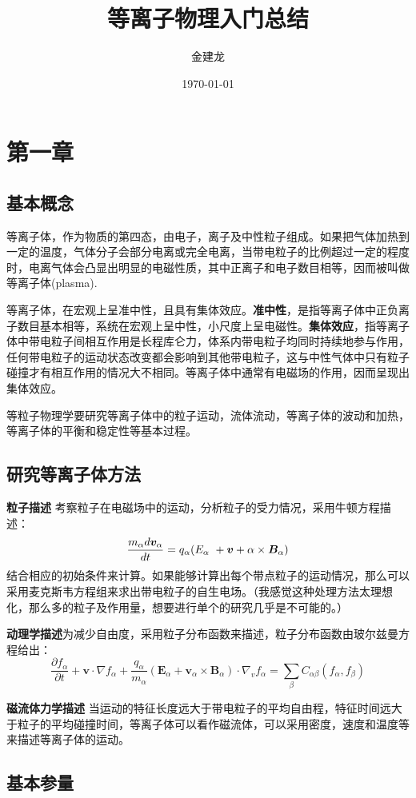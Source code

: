 \documentclass{article}
\title{等离子物理入门总结}
\author{金建龙}
\date{\today}
\begin{document}
\maketitle
\section{第一章}
\subsection{基本概念}
等离子体，作为物质的第四态，由电子，离子及中性粒子组成。如果把气体加热到一定的温度，气体分子会部分电离或完全电离，当带电粒子的比例超过一定的程度时，电离气体会凸显出明显的电磁性质，其中正离子和电子数目相等，因而被叫做等离子体(plasma).

等离子体，在宏观上呈准中性，且具有集体效应。\textbf{准中性}，是指等离子体中正负离子数目基本相等，系统在宏观上呈中性，小尺度上呈电磁性。\textbf{集体效应}，指等离子体中带电粒子间相互作用是长程库仑力，体系内带电粒子均同时持续地参与作用，任何带电粒子的运动状态改变都会影响到其他带电粒子，这与中性气体中只有粒子碰撞才有相互作用的情况大不相同。等离子体中通常有电磁场的作用，因而呈现出集体效应。

等粒子物理学要研究等离子体中的粒子运动，流体流动，等离子体的波动和加热，等离子体的平衡和稳定性等基本过程。

\subsection{研究等离子体方法}
\textbf{粒子描述}
考察粒子在电磁场中的运动，分析粒子的受力情况，采用牛顿方程描述：
$$ \frac{m_\alpha d \hm{v}_\alpha}{dt}  = q_\alpha (E_\alpha \ +\hm{v}+\alpha \times \hm{B}_\alpha) $$
结合相应的初始条件来计算。如果能够计算出每个带点粒子的运动情况，那么可以采用麦克斯韦方程组来求出带电粒子的自生电场。（我感觉这种处理方法太理想化，那么多的粒子及作用量，想要进行单个的研究几乎是不可能的。）

\textbf{动理学描述}为减少自由度，采用粒子分布函数来描述，粒子分布函数由玻尔兹曼方程给出：
$$ \frac{\partial f_\alpha}{\partial t} + \bm{v} \cdot \nabla f_\alpha + \frac{q_\alpha}{m_\alpha}(\bm E_\alpha + \bm v_\alpha \times \bm B_\alpha) \cdot \nabla _v f_\alpha = \sum_\beta C_{\alpha \beta}(f_\alpha, f_\beta) $$

\textbf{磁流体力学描述} 当运动的特征长度远大于带电粒子的平均自由程，特征时间远大于粒子的平均碰撞时间，等离子体可以看作磁流体，可以采用密度，速度和温度等来描述等离子体的运动。

\subsection{基本参量}
\end{document}
